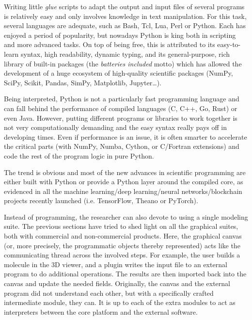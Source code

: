 Writing little \textit{glue} scripts to adapt the output and input files of several programs is relatively easy and only involves knowledge in text manipulation. For this task, several languages are adequate, such as Bash, Tcl, Lua, Perl or Python. Each has enjoyed a period of popularity, but nowadays Python is king both in scripting and more advanced tasks.\cite{pythonpaypal} On top of being free, this is attributed to its easy-to-learn syntax, high readability, dynamic typing, and its general-purpose, rich library of built-in packages (the \textit{batteries included} motto) which has allowed the development of a huge ecosystem of high-quality scientific packages (NumPy, SciPy, Scikit, Pandas, SimPy, Matplotlib, Jupyter\ldots ).

Being interpreted, Python is not a particularly fast programming language and can fall behind the performance of compiled languages (C, C++, Go, Rust) or even Java. However, putting different programs or libraries to work together is not very computationally demanding and the easy syntax really pays off in developing times. Even if performance is an issue, it is often smarter to accelerate the critical parts (with NumPy,\cite{numpy} Numba,\cite{numba} Cython,\cite{cython} or C/Fortran extensions) and code the rest of the program logic in pure Python.

The trend is obvious and most of the new advances in scientific programming are either built with Python or provide a Python layer around the compiled core, as evidenced in all the machine learning/deep learning/neural networks/blockchain projects recently launched (i.e. TensorFlow,\cite{tensorflow} Theano\cite{theano} or PyTorch\cite{pytorch}).


Instead of programming, the researcher can also devote to using a single modeling suite. The previous sections have tried to shed light on all the graphical suites, both with commercial and non-commercial products. Here, the graphical canvas (or, more precisely, the programmatic objects thereby represented) acts like the communicating thread across the involved steps. For example, the user builds a molecule in the 3D viewer, and a plugin writes the input file to an external program to do additional operations. The results are then imported back into the canvas and update the needed fields. Originally, the canvas and the external program did not understand each other, but with a specifically crafted intermediate module, they can. It is up to each of the extra modules to act as interpreters between the core platform and the external software.

